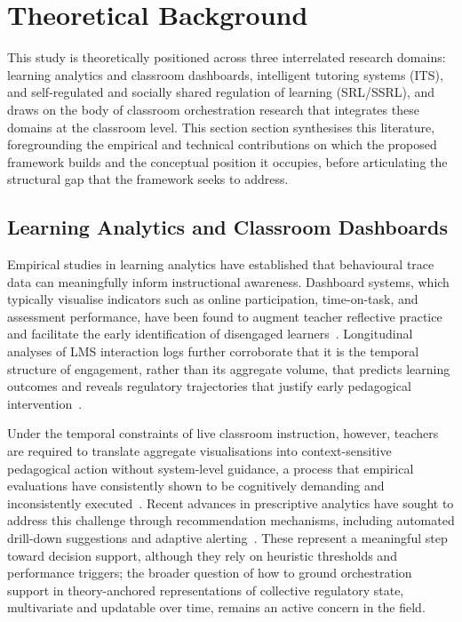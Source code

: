 \documentclass[preprint,12pt,authoryear]{elsarticle}
\begin{document}
\section{Theoretical Background}
\label{sec:related}

This study is theoretically positioned across three interrelated research domains: learning analytics and classroom dashboards, intelligent tutoring systems (ITS), and self-regulated and socially shared regulation of learning (SRL/SSRL), and draws on the body of classroom orchestration research that integrates these domains at the classroom level. This section section synthesises this literature, foregrounding the empirical and technical contributions on which the proposed framework builds and the conceptual position it occupies, before articulating the structural gap that the framework seeks to address.

\subsection{Learning Analytics and Classroom Dashboards}

Empirical studies in learning analytics have established that behavioural trace data can meaningfully inform instructional awareness. Dashboard systems, which typically visualise indicators such as online participation, time-on-task, and assessment performance, have been found to augment teacher reflective practice and facilitate the early identification of disengaged learners~\citep{han2021, wise2019, vanleeuwen2019}. Longitudinal analyses of LMS interaction logs further corroborate that it is the temporal structure of engagement, rather than its aggregate volume, that predicts learning outcomes and reveals regulatory trajectories that justify early pedagogical intervention~\citep{saqr2023, pan2024}.

Under the temporal constraints of live classroom instruction, however, teachers are required to translate aggregate visualisations into context-sensitive pedagogical action without system-level guidance, a process that empirical evaluations have consistently shown to be cognitively demanding and inconsistently executed~\citep{molenaar2019, herodotou2021, molenaar2023}. Recent advances in prescriptive analytics have sought to address this challenge through recommendation mechanisms, including automated drill-down suggestions and adaptive alerting~\citep{khosravi2021}. These represent a meaningful step toward decision support, although they rely on heuristic thresholds and performance triggers; the broader question of how to ground orchestration support in theory-anchored representations of collective regulatory state, multivariate and updatable over time, remains an active concern in the field.
\end{document}
